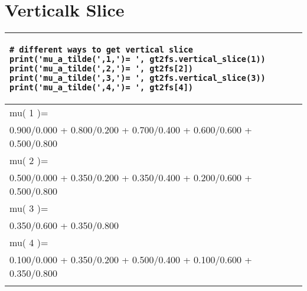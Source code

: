 \documentclass[]{article}
\begin{document}
\section{Verticalk Slice}


\begin{tabular}{|l|}
	\hline 
	\lstset{language=Python}
	\lstset{basicstyle=\scriptsize}
	\begin{lstlisting}
# different ways to get vertical slice
print('mu_a_tilde(',1,')= ', gt2fs.vertical_slice(1))
print('mu_a_tilde(',2,')= ', gt2fs[2])
print('mu_a_tilde(',3,')= ', gt2fs.vertical_slice(3))
print('mu_a_tilde(',4,')= ', gt2fs[4])
	\end{lstlisting}
	
	\\
	\hline
	
mu( 1 )=  \\
0.900/0.000 + 0.800/0.200 + 0.700/0.400 + 0.600/0.600 + 0.500/0.800\\
mu( 2 )=  \\
0.500/0.000 + 0.350/0.200 + 0.350/0.400 + 0.200/0.600 + 0.500/0.800\\
mu( 3 )=  \\
0.350/0.600 + 0.350/0.800\\
mu( 4 )=  \\
0.100/0.000 + 0.350/0.200 + 0.500/0.400 + 0.100/0.600 + 0.350/0.800\\

	\\ 
	\hline 
\end{tabular} 
\end{document}
